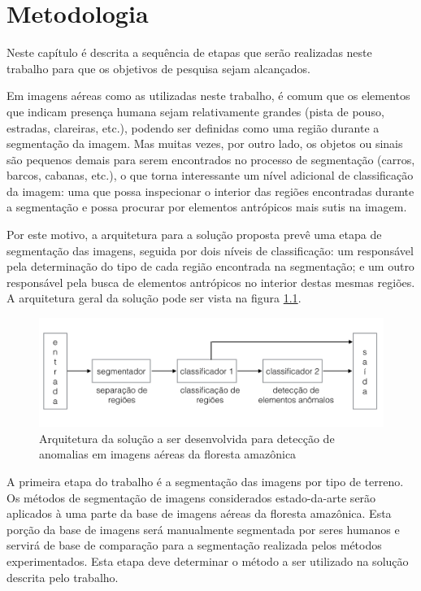 \chapter{Metodologia}\label{cap:metodologia}

Neste capítulo é descrita a sequência de etapas que serão realizadas neste trabalho para que os objetivos de pesquisa sejam alcançados.

Em imagens aéreas como as utilizadas neste trabalho, é comum que os elementos que indicam presença humana sejam relativamente grandes (pista de pouso, estradas, clareiras, etc.), podendo ser definidas como uma região durante a segmentação da imagem. Mas muitas vezes, por outro lado, os objetos ou sinais são pequenos demais para serem encontrados no processo de segmentação (carros, barcos, cabanas, etc.), o que torna interessante um nível adicional de classificação da imagem: uma que possa inspecionar o interior das regiões encontradas durante a segmentação e possa procurar por elementos antrópicos mais sutis na imagem.

Por este motivo, a arquitetura para a solução proposta prevê uma etapa de segmentação das imagens, seguida por dois níveis de classificação: um responsável pela determinação do tipo de cada região encontrada na segmentação; e um outro responsável pela busca de elementos antrópicos no interior destas mesmas regiões. A arquitetura geral da solução pode ser vista na figura \ref{fig:metDiagrama}.

\begin{figure}[h]
    \includegraphics[width=\textwidth]{imgs/arquitetura}
    \caption{Arquitetura da solução a ser desenvolvida para detecção de anomalias em imagens aéreas da floresta amazônica}
    \label{fig:metDiagrama}
\end{figure}

A primeira etapa do trabalho é a segmentação das imagens por tipo de terreno. Os métodos de segmentação de imagens considerados estado-da-arte serão aplicados à uma parte da base de imagens aéreas da floresta amazônica. Esta porção da base de imagens será manualmente segmentada por seres humanos e servirá de base de comparação para a segmentação realizada pelos métodos experimentados. Esta etapa deve determinar o método a ser utilizado na solução descrita pelo trabalho.

